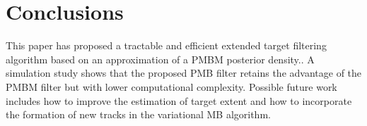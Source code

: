 \documentclass[journal]{IEEEtran}
\begin{document}
\section{Conclusions}
This paper has proposed a tractable and efficient extended target filtering algorithm based on an approximation of a PMBM posterior density.. A simulation study shows that the proposed PMB filter retains the advantage of the PMBM filter but with lower computational complexity. Possible future work includes how to improve the estimation of target extent and how to incorporate the formation of new tracks in the variational MB algorithm. 



\end{document}
